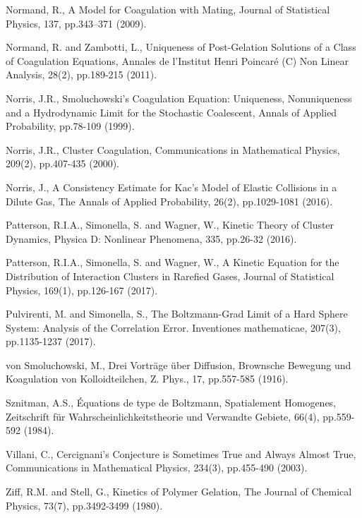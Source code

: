 \documentclass[11pt, notitlepage]{article}
\begin{document}
\begin{thebibliography}{}
 Normand, R., A Model for Coagulation with Mating, Journal of Statistical Physics, 137, pp.343--371 (2009).

 Normand, R. and Zambotti, L., Uniqueness of Post-Gelation Solutions of a Class of Coagulation Equations, Annales de l'Institut Henri Poincar\'e (C) Non Linear Analysis, 28(2), pp.189-215 (2011).


 Norris, J.R., Smoluchowski's Coagulation Equation: Uniqueness, Nonuniqueness and a Hydrodynamic Limit for the Stochastic Coalescent, Annals of Applied Probability, pp.78-109 (1999).

 Norris, J.R., Cluster Coagulation, Communications in Mathematical Physics, 209(2), pp.407-435 (2000).

 Norris, J., A Consistency Estimate for Kac's Model of Elastic Collisions in a Dilute Gas, The Annals of Applied Probability, 26(2), pp.1029-1081 (2016).


 Patterson, R.I.A., Simonella, S. and Wagner, W., Kinetic Theory of Cluster Dynamics, Physica D: Nonlinear Phenomena, 335, pp.26-32 (2016).

 Patterson, R.I.A., Simonella, S. and Wagner, W., A Kinetic Equation for the Distribution of Interaction Clusters in Rarefied Gases, Journal of Statistical Physics, 169(1), pp.126-167 (2017).

 Pulvirenti, M. and Simonella, S., The Boltzmann-Grad Limit of a Hard Sphere System: Analysis of the Correlation Error. Inventiones mathematicae, 207(3), pp.1135-1237 (2017).

 von Smoluchowski, M., Drei Vortr\"age \"uber Diffusion, Brownsche Bewegung und Koagulation von Kolloidteilchen, Z. Phys., 17, pp.557-585 (1916).

 Sznitman, A.S., \'Equations de type de Boltzmann, Spatialement Homogenes, Zeitschrift für Wahrscheinlichkeitstheorie und Verwandte Gebiete, 66(4), pp.559-592 (1984).

 Villani, C., Cercignani's Conjecture is Sometimes True and Always Almost True, Communications in Mathematical Physics, 234(3), pp.455-490 (2003).


 Ziff, R.M. and Stell, G., Kinetics of Polymer Gelation, The Journal of Chemical Physics, 73(7), pp.3492-3499 (1980).
\end{thebibliography}
\end{document}
